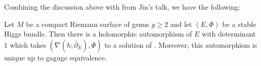 \documentclass[A4paper, 12pt, british, reqno]{amsart}
\newcommand{\1}{\mathbbm{1}}
\begin{document}
Combining the discussion above with \cite[(2.7)]{hit87a} from Jin's talk, we have the following:

\begin{thm}
    Let $M$ be a compact Riemann surface of genus $g\geqslant 2$ and let $(E,\Phi)$ be a stable Higgs bundle.
    Then there is a holomorphic automorphism of $E$ with determinant $1$ which takes $(\nabla(h;\bar{\partial}_{E}),\Phi)$ to a solution of .
    Moreover, this automorphism is unique up to gaguge equivalence.
\end{thm}



\vfill
\end{document}
